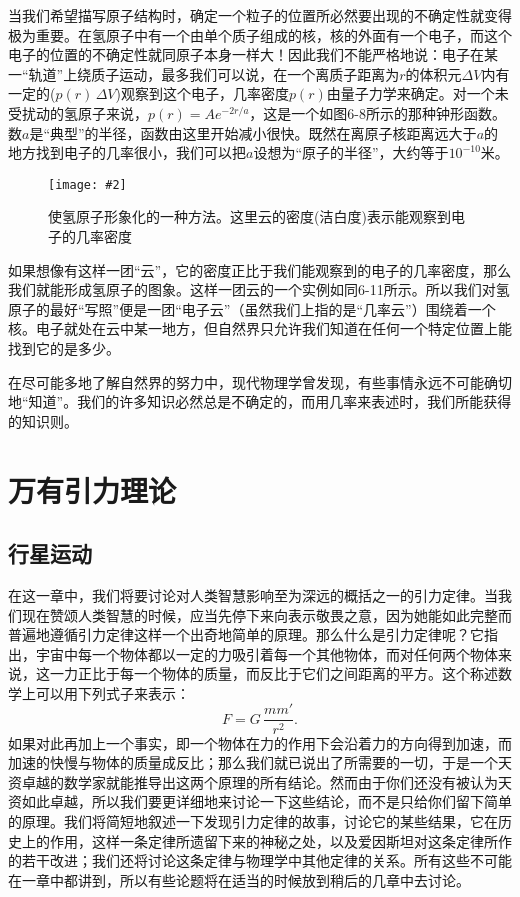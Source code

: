 \documentclass[12pt,oneside]{book}
\newenvironment{fig}[2][1]
{\begin{figure}[H]
\centering
\texttt{[image: \#2]}}
{\end{figure}}
\begin{document}
当我们希望描写原子结构时，确定一个粒子的位置所必然要出现的不确定性就变得极为重要。在氢原子中有一个由单个质子组成的核，核的外面有一个电子，而这个电子的位置的不确定性就同原子本身一样大！因此我们不能严格地说：电子在某一“轨道”上绕质子运动，最多我们可以说，在一个离质子距离为$r$的体积元$\Delta V$内有一定的($p(r)\,\Delta V$)观察到这个电子，几率密度$p(r)$由量子力学来确定。对一个未受扰动的氢原子来说，$p(r)=Ae^{-2r/a}$，这是一个如图6-8所示的那种钟形函数。数$a$是“典型”的半径，函数由这里开始减小很快。既然在离原子核距离远大于$a$的地方找到电子的几率很小，我们可以把$a$设想为“原子的半径”，大约等于$10^{-10}$米。
\begin{fig}[3]{使氢原子形象化的一种方法}
\caption{\footnotesize 使氢原子形象化的一种方法。这里云的密度(洁白度)表示能观察到电子的几率密度}
\label{fig:使氢原子形象化的一种方法}
\end{fig}

如果想像有这样一团“云”，它的密度正比于我们能观察到的电子的几率密度，那么我们就能形成氢原子的图象。这样一团云的一个实例如同6-11所示。所以我们对氢原子的最好“写照”便是一团“电子云”（虽然我们上指的是“几率云”）围绕着一个核。电子就处在云中某一地方，但自然界只允许我们知道在任何一个特定位置上能找到它的是多少。

在尽可能多地了解自然界的努力中，现代物理学曾发现，有些事情永远不可能确切地“知道”。我们的许多知识必然总是不确定的，而用几率来表述时，我们所能获得的知识则。



\chapter{万有引力理论}
\section{行星运动}
在这一章中，我们将要讨论对人类智慧影响至为深远的概括之一的引力定律。当我们现在赞颂人类智慧的时候，应当先停下来向表示敬畏之意，因为她能如此完整而普遍地遵循引力定律这样一个出奇地简单的原理。那么什么是引力定律呢？它指出，宇宙中每一个物体都以一定的力吸引着每一个其他物体，而对任何两个物体来说，这一力正比于每一个物体的质量，而反比于它们之间距离的平方。这个称述数学上可以用下列式子来表示：
\begin{equation*}
F=G\,\frac{mm'}{r^2}.
\end{equation*}
如果对此再加上一个事实，即一个物体在力的作用下会沿着力的方向得到加速，而加速的快慢与物体的质量成反比；那么我们就已说出了所需要的一切，于是一个天资卓越的数学家就能推导出这两个原理的所有结论。然而由于你们还没有被认为天资如此卓越，所以我们要更详细地来讨论一下这些结论，而不是只给你们留下简单的原理。我们将简短地叙述一下发现引力定律的故事，讨论它的某些结果，它在历史上的作用，这样一条定律所遗留下来的神秘之处，以及爱因斯坦对这条定律所作的若干改进；我们还将讨论这条定律与物理学中其他定律的关系。所有这些不可能在一章中都讲到，所以有些论题将在适当的时候放到稍后的几章中去讨论。
\end{document}
